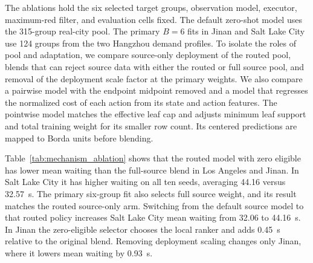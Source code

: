 \documentclass[letterpaper,journal]{IEEEtran}
\begin{document}
The ablations hold the six selected target groups, observation model, executor, maximum-red filter, and evaluation cells fixed. The default zero-shot model uses the 315-group real-city pool. The primary $B=6$ fits in Jinan and Salt Lake City use 124 groups from the two Hangzhou demand profiles. To isolate the roles of pool and adaptation, we compare source-only deployment of the routed pool, blends that can reject source data with either the routed or full source pool, and removal of the deployment scale factor at the primary weights. We also compare a pairwise model with the endpoint midpoint removed and a model that regresses the normalized cost of each action from its state and action features. The pointwise model matches the effective leaf cap and adjusts minimum leaf support and total training weight for its smaller row count. Its centered predictions are mapped to Borda units before blending.

\begin{table}[!t]
\centering
\caption{Mechanism Ablations on the Corrected Evaluation Panel}
\label{tab:mechanism_ablation}
\footnotesize
{}
\end{table}

Table~\ref{tab:mechanism_ablation} shows that the routed model with zero eligible has lower mean waiting than the full-source blend in Los Angeles and Jinan. In Salt Lake City it has higher waiting on all ten seeds, averaging 44.16 versus 32.57~s. The primary six-group fit also selects full source weight, and its result matches the routed source-only arm. Switching from the default source model to that routed policy increases Salt Lake City mean waiting from 32.06 to 44.16~s. In Jinan the zero-eligible selector chooses the local ranker and adds 0.45~s relative to the original blend. Removing deployment scaling changes only Jinan, where it lowers mean waiting by 0.93~s.
\end{document}
